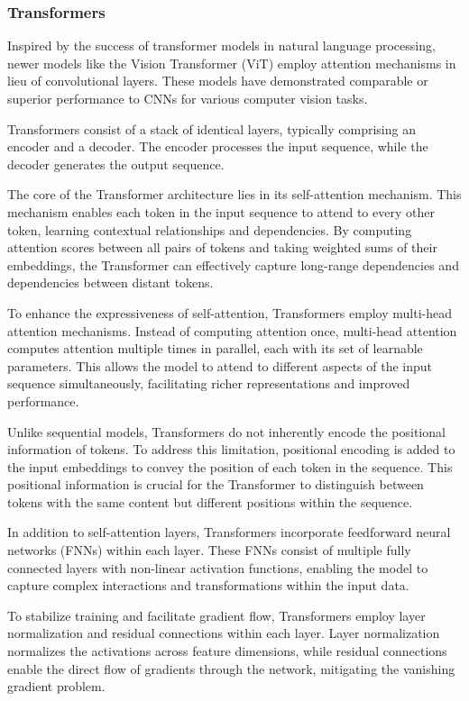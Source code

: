 \subsubsection{Transformers}
Inspired by the success of transformer models in natural language processing, newer models like the Vision Transformer (ViT) employ attention mechanisms in lieu of convolutional layers. These models have demonstrated comparable or superior performance to CNNs for various computer vision tasks.

Transformers consist of a stack of identical layers, typically comprising an encoder and a decoder. The encoder processes the input sequence, while the decoder generates the output sequence.

The core of the Transformer architecture lies in its self-attention mechanism. This mechanism enables each token in the input sequence to attend to every other token, learning contextual relationships and dependencies. By computing attention scores between all pairs of tokens and taking weighted sums of their embeddings, the Transformer can effectively capture long-range dependencies and dependencies between distant tokens.

To enhance the expressiveness of self-attention, Transformers employ multi-head attention mechanisms. Instead of computing attention once, multi-head attention computes attention multiple times in parallel, each with its set of learnable parameters. This allows the model to attend to different aspects of the input sequence simultaneously, facilitating richer representations and improved performance.

Unlike sequential models, Transformers do not inherently encode the positional information of tokens. To address this limitation, positional encoding is added to the input embeddings to convey the position of each token in the sequence. This positional information is crucial for the Transformer to distinguish between tokens with the same content but different positions within the sequence.

In addition to self-attention layers, Transformers incorporate feedforward neural networks (FNNs) within each layer. These FNNs consist of multiple fully connected layers with non-linear activation functions, enabling the model to capture complex interactions and transformations within the input data.

To stabilize training and facilitate gradient flow, Transformers employ layer normalization and residual connections within each layer. Layer normalization normalizes the activations across feature dimensions, while residual connections enable the direct flow of gradients through the network, mitigating the vanishing gradient problem.

